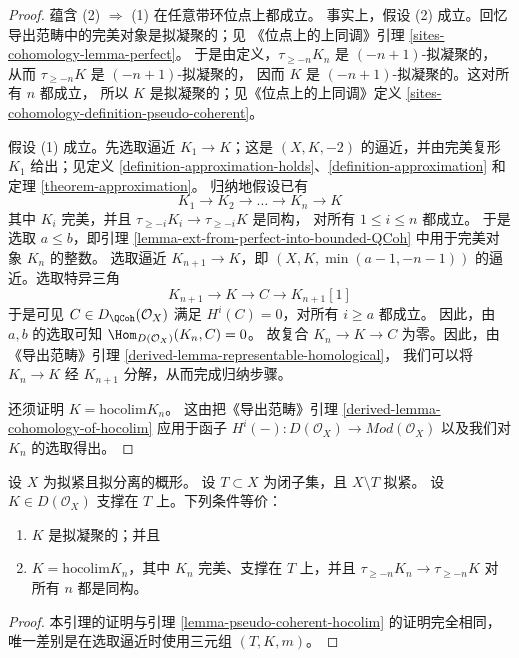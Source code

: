 \begin{proof}
蕴含 (2) $\Rightarrow$ (1) 在任意带环位点上都成立。
事实上，假设 (2) 成立。回忆导出范畴中的完美对象是拟凝聚的；见
《位点上的上同调》引理 \ref{sites-cohomology-lemma-perfect}。
于是由定义，$\tau_{\geq -n}K_n$ 是 $(-n + 1)$-拟凝聚的，
从而 $\tau_{\geq -n}K$ 是 $(-n + 1)$-拟凝聚的，
因而 $K$ 是 $(-n + 1)$-拟凝聚的。这对所有 $n$ 都成立，
所以 $K$ 是拟凝聚的；见《位点上的上同调》定义
\ref{sites-cohomology-definition-pseudo-coherent}。

\medskip\noindent
假设 (1) 成立。先选取逼近 $K_1 \to K$；这是
$(X, K, -2)$ 的逼近，并由完美复形 $K_1$ 给出；见定义
\ref{definition-approximation-holds}、\ref{definition-approximation}
和定理 \ref{theorem-approximation}。
归纳地假设已有
$$
K_1 \to K_2 \to \ldots \to K_n \to K
$$
其中 $K_i$ 完美，并且
$\tau_{\geq -i}K_i \to \tau_{\geq -i}K$ 是同构，
对所有 $1 \leq i \leq n$ 都成立。%
于是选取 $a \leq b$，即引理
\ref{lemma-ext-from-perfect-into-bounded-QCoh} 中用于完美对象 $K_n$
的整数。
选取逼近 $K_{n + 1} \to K$，即
$(X, K, \min(a - 1, -n - 1))$ 的逼近。选取特异三角
$$
K_{n + 1} \to K \to C \to K_{n + 1}[1]
$$
于是可见 $C \in D_\QCoh(\mathcal{O}_X)$ 满足
$H^i(C) = 0$，对所有 $i \geq a$ 都成立。
因此，由 $a, b$ 的选取可知
$\Hom_{D(\mathcal{O}_X)}(K_n, C) = 0$。
故复合 $K_n \to K \to C$ 为零。因此，由《导出范畴》引理
\ref{derived-lemma-representable-homological}，
我们可以将 $K_n \to K$ 经 $K_{n + 1}$ 分解，从而完成归纳步骤。

\medskip\noindent
还须证明 $K = \text{hocolim} K_n$。
这由把《导出范畴》引理
\ref{derived-lemma-cohomology-of-hocolim} 应用于函子
$H^i( - ) : D(\mathcal{O}_X) \to \textit{Mod}(\mathcal{O}_X)$
以及我们对 $K_n$ 的选取得出。
\end{proof}

\begin{lemma}
\label{lemma-pseudo-coherent-hocolim-with-support}
设 $X$ 为拟紧且拟分离的概形。
设 $T \subset X$ 为闭子集，且 $X \setminus T$ 拟紧。
设 $K \in D(\mathcal{O}_X)$ 支撑在 $T$ 上。下列条件等价：
\begin{enumerate}
\item $K$ 是拟凝聚的；并且
\item $K = \text{hocolim} K_n$，其中
$K_n$ 完美、支撑在 $T$ 上，并且
$\tau_{\geq -n}K_n \to \tau_{\geq -n}K$ 对所有 $n$ 都是同构。
\end{enumerate}
\end{lemma}

\begin{proof}
本引理的证明与引理
\ref{lemma-pseudo-coherent-hocolim} 的证明完全相同，
唯一差别是在选取逼近时使用三元组 $(T, K, m)$。
\end{proof}











